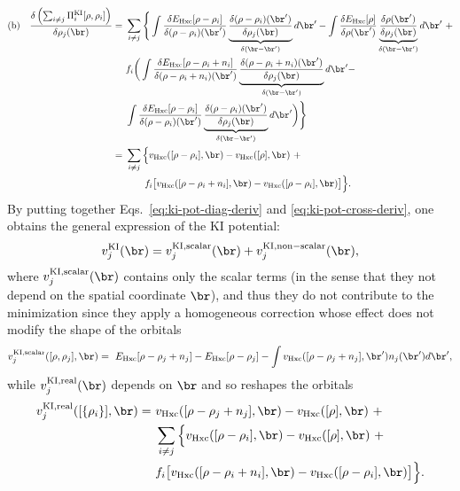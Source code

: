 \begin{equation}
    \begin{split}
    \text{(b)} \quad \frac{\delta \left( \sum_{i \neq j} \Pi^{\rm KI}_i[\rho,\rho_i] \right)}{\delta \rho_j(\br)}
    = \ &\sum_{i \neq j} \Bigg\{ \int \frac{\delta E_{\rm Hxc}[\rho-\rho_i]}{\delta(\rho-\rho_i)(\br')} 
    \underbrace{\frac{\delta(\rho-\rho_i)(\br')}{\delta\rho_j(\br)}}_{\delta(\br-\br')} d\br' -
    \int \frac{\delta E_{\rm Hxc}[\rho]}{\delta\rho(\br')} \underbrace{\frac{\delta\rho(\br')}{\delta\rho_j(\br)}}_{\delta(\br-\br')} d\br' \ + \\
    &f_i \bigg( \int \frac{\delta E_{\rm Hxc}[\rho-\rho_i+n_i]}{\delta(\rho-\rho_i+n_i)(\br')} \underbrace{\frac{\delta(\rho-\rho_i+n_i)(\br')}{\delta\rho_j(\br)}}_{\delta(\br-\br')} d\br' - \\
    &\int \frac{\delta E_{\rm Hxc}[\rho-\rho_i]}{\delta(\rho-\rho_i)(\br')} \underbrace{\frac{\delta(\rho-\rho_i)(\br')}{\delta\rho_j(\br)}}_{\delta(\br-\br')} d\br' \bigg) \Bigg\} \\
    = \ &\sum_{i \neq j} \Big\{ v_{\rm Hxc}([\rho-\rho_i],\br) - v_{\rm Hxc}([\rho],\br) \ + \\
    &\qquad f_i \big[v_{\rm Hxc}([\rho-\rho_i+n_i],\br) - v_{\rm Hxc}([\rho-\rho_i],\br)\big] \Big\} .
    \end{split}
    \label{eq:ki-pot-cross-deriv}
\end{equation}
%
By putting together Eqs.~\eqref{eq:ki-pot-diag-deriv} and \eqref{eq:ki-pot-cross-deriv}, one obtains the general expression of the KI potential:
%
\begin{equation}
    v^{\rm KI}_j(\br) = v^{\rm KI,scalar}_j(\br) + v^{\rm KI,non-scalar}_j(\br) ,
    \label{eq:ki-pot-final}
\end{equation}
%
where $v^{\rm KI,scalar}_j(\br)$ contains only the scalar terms (in the sense that they not depend on the spatial coordinate $\br$), and thus they do not contribute to the minimization since they apply a homogeneous correction whose effect does not modify the shape of the orbitals
%
\begin{equation}
    v^{\rm KI,scalar}_j([\rho,\rho_j],\br) =\ E_{\rm Hxc}[\rho-\rho_j+n_j] - E_{\rm Hxc}[\rho-\rho_j] - \int v_{\rm Hxc}([\rho-\rho_j+n_j],\br') n_j(\br') d\br' ,
    \label{eq:ki-pot-scalar}
\end{equation}
%
while $v^{\rm KI,real}_j(\br)$ depends on $\br$ and so reshapes the orbitals
%
\begin{equation}
    \begin{split}
    v^{\rm KI,real}_j([\{\rho_i\}],\br) =\ &v_{\rm Hxc}([\rho-\rho_j+n_j],\br) - v_{\rm Hxc}([\rho],\br) \ + \\
    &\sum_{i \neq j} \Big\{ v_{\rm Hxc}([\rho-\rho_i],\br) - v_{\rm Hxc}([\rho],\br) \ + \\
    &f_i \big[v_{\rm Hxc}([\rho-\rho_i+n_i],\br) - v_{\rm Hxc}([\rho-\rho_i],\br)\big] \Big\} .
    \end{split}
    \label{eq:ki-pot-real}
\end{equation}

